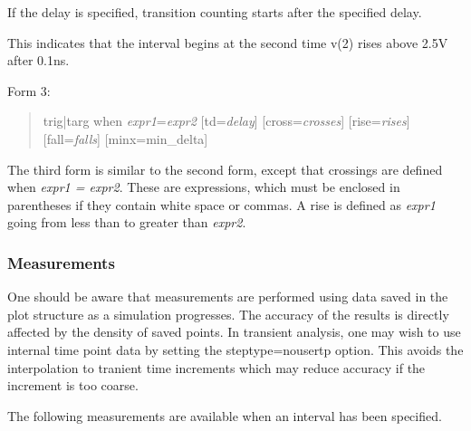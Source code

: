 If the delay is specified, transition counting starts after the
specified delay.


This indicates that the interval begins at the second time {\vt v(2)} rises
above 2.5V after 0.1ns.

Form 3:
\begin{quote}\vt
    trig|targ when {\it expr1\/}={\it expr2} [td={\it delay}]
        [cross={\it crosses}] [rise={\it rises}] [fall={\it falls}]
        [minx={\vt min\_delta}]
\end{quote}

The third form is similar to the second form, except that crossings
are defined when {\it expr1 = expr2}.  These are expressions, which
must be enclosed in parentheses if they contain white space or commas. 
A rise is defined as {\it expr1} going from less than to greater than
{\it expr2}.

\subsubsection{Measurements}

One should be aware that measurements are performed using data saved
in the plot structure as a simulation progresses.  The accuracy of the
results is directly affected by the density of saved points.  In
transient analysis, one may wish to use internal time point data by
setting the {\vt steptype=nousertp} option.  This avoids the
interpolation to tranient time increments which may reduce accuracy if
the increment is too coarse.

The following measurements are available when an interval has been
specified.


